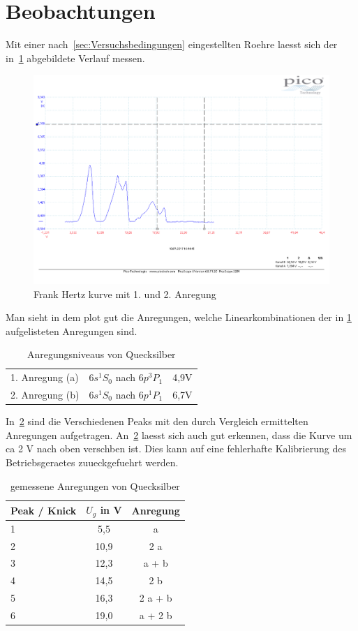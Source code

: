 \section{Beobachtungen}
Mit einer nach~\ref{sec:Versuchsbedingungen} eingestellten Roehre laesst sich der in~\ref{fig:FrankHertz2} abgebildete Verlauf messen.
\begin{figure}
	\includegraphics[width=\textwidth]{../Daten/Frank_Hertz_2.pdf}
	\caption{Frank Hertz kurve mit 1. und 2. Anregung}
	\label{fig:FrankHertz2}
\end{figure}
Man sieht in dem plot gut die Anregungen, welche Linearkombinationen der in \ref{tab:hgAnr} aufgelisteten Anregungen sind.
\begin{table}
	\centering
	\caption{Anregungsniveaus von Quecksilber}
	\begin{tabular}{l | c c}
		\toprule
		1. Anregung (a) & $6s^1S_0$ nach $6p^3P_1$ & 4,9V\\
		2. Anregung (b)& $6s^1S_0$ nach $6p^1P_1$ & 6,7V\\
	\end{tabular}
	\label{tab:hgAnr}
\end{table}
In~\ref{tab:hgAnrgem} sind die Verschiedenen Peaks mit den durch Vergleich ermittelten Anregungen aufgetragen.
An~\ref{tab:hgAnrgem} laesst sich auch gut erkennen, dass die Kurve um ca 2 V nach oben verschben ist.
Dies kann auf eine fehlerhafte Kalibrierung des Betriebsgeraetes zuueckgefuehrt werden.
\begin{table}
	\centering
	\caption{gemessene Anregungen von Quecksilber}
	\begin{tabular}{l | c c}
		Peak / Knick & $U_g$ in V& Anregung\\
		\midrule
		1 & 5,5 & a \\
		2 & 10,9 & 2 a \\
		3 & 12,3 & a + b \\
		4 & 14,5 & 2 b \\
		5 & 16,3 & 2 a + b \\
		6 & 19,0 & a + 2 b \\
	\end{tabular}
	\label{tab:hgAnrgem}
\end{table}

